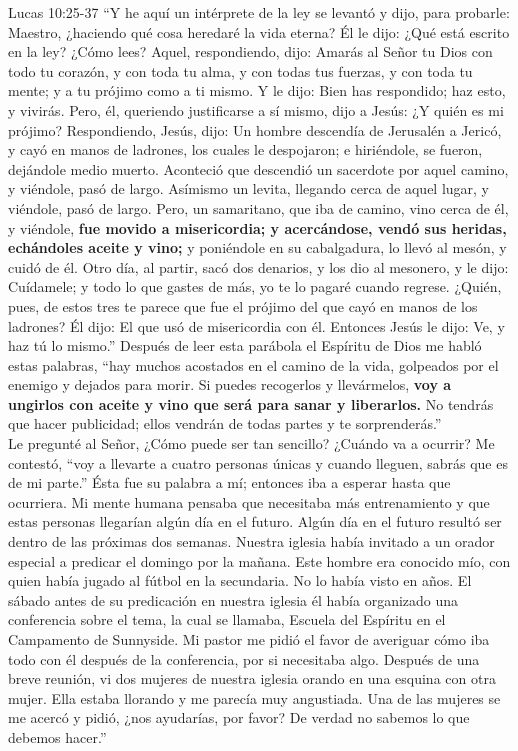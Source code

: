 \documentclass[twoside, 12pt]{book}
\begin{document}
Lucas 10:25-37 “Y he aquí un intérprete de la ley se levantó y dijo, para probarle: Maestro, ¿haciendo qué cosa heredaré la vida eterna? Él le dijo: ¿Qué está escrito en la ley? ¿Cómo lees? Aquel, respondiendo, dijo: Amarás al Señor tu Dios con todo tu corazón, y con toda tu alma, y con todas tus fuerzas, y con toda tu mente; y a tu prójimo como a ti mismo. Y le dijo: Bien has respondido; haz esto, y vivirás. Pero, él, queriendo justificarse a sí mismo, dijo a Jesús: ¿Y quién es mi prójimo? Respondiendo, Jesús, dijo: Un hombre descendía de Jerusalén a Jericó, y cayó en manos de ladrones, los cuales le despojaron; e hiriéndole, se fueron, dejándole medio muerto. Aconteció que descendió un sacerdote por aquel camino, y viéndole, pasó de largo.  Asímismo un levita, llegando cerca de aquel lugar, y viéndole, pasó de largo. Pero, un samaritano, que iba de camino, vino cerca de él, y viéndole, \textbf{fue movido a misericordia; y acercándose, vendó sus heridas, echándoles aceite y vino;} y poniéndole en su cabalgadura, lo llevó al mesón, y cuidó de él. Otro día, al partir, sacó dos denarios, y los dio al mesonero, y le dijo: Cuídamele; y todo lo que gastes de más, yo te lo pagaré cuando regrese. ¿Quién, pues, de estos tres te parece que fue el prójimo del que cayó en manos de los ladrones? Él dijo: El que usó de misericordia con él. Entonces Jesús le dijo: Ve, y haz tú lo mismo.”
Después de leer esta parábola el Espíritu de Dios me habló estas palabras, “hay muchos acostados en el camino de la vida, golpeados por el enemigo y dejados para morir. Si puedes recogerlos y llevármelos, \textbf{voy a ungirlos con aceite y vino que será para sanar y liberarlos.} No tendrás que hacer publicidad; ellos vendrán de todas partes y te sorprenderás.”\\

Le pregunté al Señor, ¿Cómo puede ser tan sencillo? ¿Cuándo va a ocurrir? Me contestó, “voy a llevarte a cuatro personas únicas y cuando lleguen, sabrás que es de mi parte.” Ésta fue su palabra a mí; entonces iba a esperar hasta que ocurriera. Mi mente humana pensaba que necesitaba más entrenamiento y que estas personas llegarían algún día en el futuro. Algún día en el futuro resultó ser dentro de las próximas dos semanas. Nuestra iglesia había invitado a un orador especial a predicar el domingo por la mañana. Este hombre era conocido mío, con quien había jugado al fútbol en la secundaria. No lo había visto en años. El sábado antes de su predicación en nuestra iglesia él había organizado una conferencia sobre el tema, la cual se llamaba, Escuela del Espíritu en el Campamento de Sunnyside. Mi pastor me pidió el favor de averiguar cómo iba todo con él después de la conferencia, por si necesitaba algo. Después de una breve reunión, vi dos mujeres de nuestra iglesia orando en una esquina con otra mujer. Ella estaba llorando y me parecía muy angustiada. Una de las mujeres se me acercó y pidió, ¿nos ayudarías, por favor? De verdad no sabemos lo que debemos hacer.”\\
\end{document}
